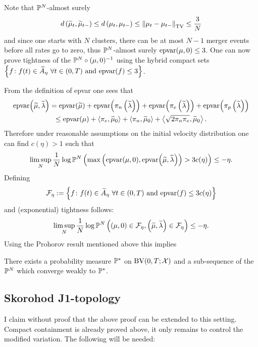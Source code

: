 Note that $\mathbb{P}^N$-almost surely
\begin{equation*}
    d\left(\widetilde{\mu}_t, \widetilde{\mu}_{t-}\right) \leq d\left(\mu_t, \mu_{t-}\right) \leq \left\lVert{\mu_t - \mu_{t-}}\right\rVert_\mathrm{TV} \leq \frac3N
\end{equation*}
and since one starts with $N$ clusters, there can be at most $N-1$ merger events before all rates go to zero, thus $\mathbb{P}^N$-almost surely $\mathrm{epvar}{\left({\mu, 0}\right)} \leq 3$.
One can now prove tightness of the $\mathbb{P}^N \circ (\mu, 0)^{-1}$ using the hybrid compact sets $\left\{f \colon f(t) \in \widetilde{A}_\eta\ \forall t \in (0,T) \text{ and } \epvar{f} \leq 3\right\}$.

From the definition of epvar one sees that 
\begin{multline*}
    \mathrm{epvar}{\left({\widetilde{\mu}, \widetilde{\lambda}}\right)} = \mathrm{epvar}{\left({\widetilde{\mu}}\right)} + \mathrm{epvar}{\left({\pi_n\left(\widetilde{\lambda}\right)}\right)} + \mathrm{epvar}{\left({\pi_e\left(\widetilde{\lambda}\right)}\right)} + \mathrm{epvar}{\left({\pi_p\left(\widetilde{\lambda}\right)}\right)} \\
    \leq
    \mathrm{epvar}{\left({\mu}\right)} + \left<\pi_e, \widetilde{\mu}_0\right> + \left<\pi_n, \widetilde{\mu}_0\right> + \left<\sqrt{2\pi_n \pi_e}, \widetilde{\mu}_0\right>.
\end{multline*}
Therefore under reasonable assumptions on the initial velocity distribution one can find $c(\eta) > 1$ such that
\begin{equation}
    \limsup_N \frac1N \log\mathbb{P}^N\left(\max\left(\mathrm{epvar}{\left({\mu, 0}\right)}, \mathrm{epvar}{\left({\widetilde{\mu}, \widetilde{\lambda}}\right)}\right) > 3 c(\eta)\right) \leq -\eta.
\end{equation}
Defining
\begin{equation}
    \mathcal{F}_\eta
    := 
    \left\{f \colon f(t) \in \widetilde{A}_\eta\ \forall t \in (0,T) \text{ and } 
                    \mathrm{epvar}{\left({f}\right)} \leq 3c(\eta)\right\}
\end{equation}
and (exponential) tightness follows:
\begin{equation*}
    \limsup_N \frac1N \log \mathbb{P}^N\left((\mu, 0) \in \mathcal{F}_\eta, \left(\widetilde{\mu}, \widetilde{\lambda}\right) \in \mathcal{F}_\eta\right) \leq -\eta.
\end{equation*}
Using the Prohorov result mentioned above this implies
\begin{proposition}
There exists a probability measure $\mathbb{P}^\ast$ on $\mathrm{BV}(0,T;\mathcal{X})$ and a sub-sequence of the $\mathbb{P}^N$ which converge weakly to $\mathbb{P}^\ast$.
\end{proposition}

\subsection{Skorohod J1-topology}
I claim without proof that the above proof can be extended to this setting.
Compact containment is already proved above, it only remains to control the modified variation.
The following will be needed:

